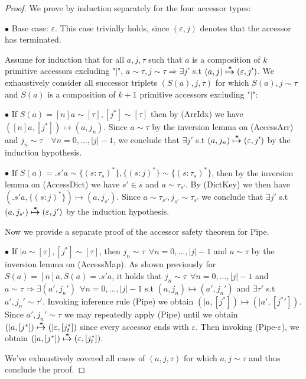 \documentclass[11pt]{article}
\begin{document}
\begin{proof}
We prove by induction separately for the four accessor types: 

$\bullet$ Base case: $\varepsilon$. This case trivially holds, since $(\varepsilon, j)$ denotes that the accessor has terminated. 

Assume for induction that for all $a, j, \tau$ such that $a$ is a composition of $k$ primitive accessors excluding "$|$", $a \sim \tau, j \sim \tau \Rightarrow \exists j'$ s.t $(a, j) \boldsymbol{\overset{*}{\mapsto}} (\varepsilon, j')$. We exhaustively consider all successor triplets $(S(a), j, \tau)$ for which $S(a), j \sim \tau$ and $S(a)$ is a composition of $k+1$ primitive accessors excluding "$|$": 

$\bullet$ If $S(a) = [n]a \sim [\tau], [j^*] \sim [\tau]$ then by (ArrIdx) we have $([n]a, [j^*]) \mapsto (a, j_{n})$. Since $a \sim \tau$ by the inversion lemma on (AccessArr) and $j _{n} \sim \tau \quad \forall n = 0, ..., |j|-1$, we conclude that $\exists j'$ s.t $(a, j_{n}) \boldsymbol{\overset{*}{\mapsto}} (\varepsilon, j')$ by the induction hypothesis. 

$\bullet$ If $S(a) = .s'a \sim \{(s: \tau_{s})^*\}, \{(s: j)^*\} \sim \{(s: \tau_{s})^*\}$,  then by the inversion lemma on (AccessDict) we have $s' \in s$ and $a \sim \tau_{s'}$. By (DictKey) we then have $(.s'a, \{(s: j)^*\}) \mapsto (a, j_{s'})$. Since $a \sim \tau_{s'}, j _{s'} \sim \tau_{s'}$ we conclude that $\exists j'$ s.t $(a, j_{s'}) \boldsymbol{\overset{*}{\mapsto}} (\varepsilon, j')$ by the induction hypothesis. 

Now we provide a separate proof of the accessor safety theorem for Pipe. 

$\bullet$ If $|a \sim [\tau], [j^*] \sim [\tau]$, then $j_{n} \sim \tau ~~ \forall n = 0, ..., |j|-1$ and $a \sim \tau$ by the inversion lemma on (AccessMap). As shown previously for $S(a) = [n]a, S(a) = .s'a$, it holds that $j_{n} \sim \tau~~\forall n = 0, ..., |j|-1$ and $a \sim \tau \Rightarrow \exists (a', j_{n}')~~\forall n = 0, ..., |j|-1$ s.t $(a, j_{n}) \mapsto (a', j_{n}')$ and $\exists \tau'$ s.t $a', j_{n}' \sim \tau'$. Invoking inference rule (Pipe) we obtain $(|a, [j^*]) \mapsto (|a', [j^*'])$. Since $a', j_{n}' \sim \tau$ we may repeatedly apply (Pipe) until we obtain $(|a, [j^*]) \boldsymbol{\overset{*}{\mapsto}} (|\varepsilon, [j_{t}^*])$ since every accessor ends with $\varepsilon$. Then invoking (Pipe-$\varepsilon$), we obtain $(|a, [j^*]) \boldsymbol{\overset{*}{\mapsto}} (\varepsilon, [j_{t}^*])$. 

We've exhaustively covered all cases of $(a, j, \tau)$ for which $a, j \sim \tau$ and thus conclude the proof. 


\end{proof}
\end{document}
